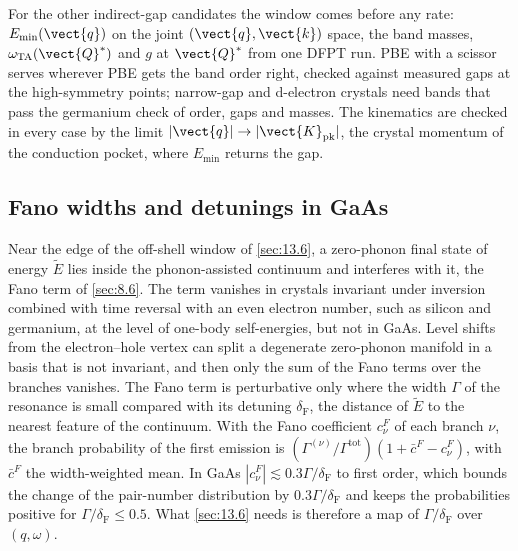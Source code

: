 For the other indirect-gap candidates the window comes before any rate: $E_{\mathrm{min}}(\vect{q})$ on the joint $(\vect{q},\vect{k})$ space, the band masses, $\omega_{\mathrm{TA}}(\vect{Q}^*)$ and $g$ at $\vect{Q}^*$ from one DFPT run. PBE with a scissor serves wherever PBE gets the band order right, checked against measured gaps at the high-symmetry points; narrow-gap and d-electron crystals need bands that pass the germanium check of order, gaps and masses. The kinematics are checked in every case by the limit $|\vect{q}| \to |\vect{K}_{\mathrm{pk}}|$, the crystal momentum of the conduction pocket, where $E_{\mathrm{min}}$ returns the gap.

\subsection{Fano widths and detunings in GaAs}

Near the edge of the off-shell window of \cref{sec:13.6}, a zero-phonon final state of energy $\tilde E$ lies inside the phonon-assisted continuum and interferes with it, the Fano term of \cref{sec:8.6}. The term vanishes in crystals invariant under inversion combined with time reversal with an even electron number, such as silicon and germanium, at the level of one-body self-energies, but not in GaAs. Level shifts from the electron--hole vertex can split a degenerate zero-phonon manifold in a basis that is not invariant, and then only the sum of the Fano terms over the branches vanishes. The Fano term is perturbative only where the width $\varGamma$ of the resonance is small compared with its detuning $\delta_{\mathrm{F}}$, the distance of $\tilde E$ to the nearest feature of the continuum. With the Fano coefficient $c^F_\nu$ of each branch $\nu$, the branch probability of the first emission is $(\varGamma^{(\nu)}/\varGamma^{\mathrm{tot}})(1 + \bar c^F - c^F_\nu)$, with $\bar c^F$ the width-weighted mean. In GaAs $|c^F_\nu| \lesssim 0.3\varGamma/\delta_{\mathrm{F}}$ to first order, which bounds the change of the pair-number distribution by $0.3\varGamma/\delta_{\mathrm{F}}$ and keeps the probabilities positive for $\varGamma/\delta_{\mathrm{F}} \le 0.5$. What \cref{sec:13.6} needs is therefore a map of $\varGamma/\delta_{\mathrm{F}}$ over $(q,\omega)$.

